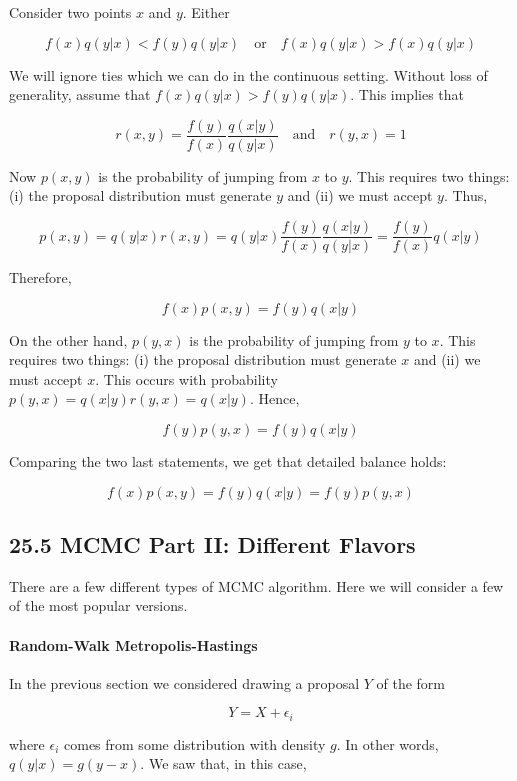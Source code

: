 Consider two points \(x\) and \(y\). Either

\[
f(x) q(y | x) < f(y) q(y | x)
\quad \text{or} \quad
f(x) q(y | x) > f(x) q(y | x)
\]

We will ignore ties which we can do in the continuous setting. Without
loss of generality, assume that \(f(x) q(y | x) > f(y) q(y | x)\). This
implies that

\[ r(x, y) = \frac{f(y)}{f(x)} \frac{q(x | y)}{q(y | x)} 
\quad \text{and} \quad
r(y, x) = 1
\]

Now \(p(x, y)\) is the probability of jumping from \(x\) to \(y\). This
requires two things: (i) the proposal distribution must generate \(y\)
and (ii) we must accept \(y\). Thus,

\[ p(x, y) = q(y | x) r(x, y) =  q(y | x) \frac{f(y)}{f(x)} \frac{q(x | y)}{q(y | x)} = \frac{f(y)}{f(x)} q(x | y)\]

Therefore,

\[ f(x) p(x, y) = f(y) q(x | y) \]

On the other hand, \(p(y, x)\) is the probability of jumping from \(y\)
to \(x\). This requires two things: (i) the proposal distribution must
generate \(x\) and (ii) we must accept \(x\). This occurs with
probability \(p(y, x) = q(x | y) r(y, x) = q(x | y)\). Hence,

\[ f(y) p(y, x) = f(y) q(x | y) \]

Comparing the two last statements, we get that detailed balance holds:

\[ f(x) p(x, y) = f(y) q(x | y) = f(y) p(y, x) \]

\subsection*{25.5 MCMC Part II: Different Flavors}\label{mcmc-part-ii-different-flavors}

There are a few different types of MCMC algorithm. Here we will consider
a few of the most popular versions.

\paragraph{Random-Walk Metropolis-Hastings}\label{random-walk-metropolis-hastings}

In the previous section we considered drawing a proposal \(Y\) of the
form

\[ Y = X + \epsilon_{i} \]

where \(\epsilon_{i}\) comes from some distribution with density \(g\). In
other words, \(q(y | x) = g(y - x)\). We saw that, in this case,

